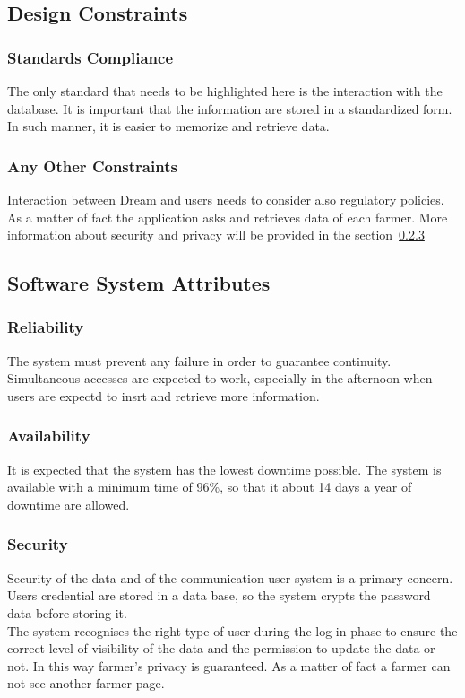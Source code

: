 \subsection{Design Constraints}
\subsubsection{Standards Compliance}
The only standard that needs to be highlighted here is the interaction with the database. It is important that the information are stored 
in a standardized form. In such manner, it is easier to memorize and retrieve data.


\subsubsection{Any Other Constraints}
Interaction between Dream and users needs to consider also regulatory policies.
As a matter of fact the application asks and retrieves data of each farmer.
More information about security and privacy will be provided in the section~\ref{subsubsection:3.4.3}


\subsection{Software System Attributes}

\subsubsection{Reliability}
The system must prevent any failure in order to guarantee continuity. 
Simultaneous accesses are expected to work, especially in the afternoon when users are expectd to insrt and retrieve more information.

\subsubsection{Availability}
It is expected that the system has the lowest downtime possible. 
The system is available with a minimum time of 96\%, 
so that it about 14 days a year of downtime are allowed.


\subsubsection{Security}
\label{subsubsection:3.4.3}
Security of the data and of the communication user-system is a primary concern. Users credential are stored in a data base, 
so the system crypts the password data before storing it. \\
The system recognises the right type of user during the log in phase to ensure the correct 
level of visibility of the data and the permission to update the data or not. 
In this way farmer’s privacy is guaranteed. As a matter of fact a farmer can not see another farmer page.


